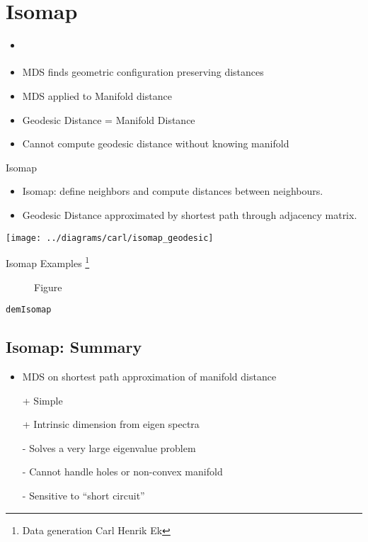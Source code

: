 \section{Isomap}


\begin{itemize}
\item \emph{\cite{Tenenbaum:isomap00}}
\item MDS finds geometric configuration preserving distances 
\item MDS applied to Manifold distance 
\item Geodesic Distance = Manifold Distance 
\item Cannot compute geodesic distance without knowing manifold 
\end{itemize}
Isomap
\begin{itemize}
\item Isomap: define neighbors and compute distances between neighbours.
\item Geodesic Distance approximated by shortest path through adjacency
matrix. 
\end{itemize}
\texttt{[image: ../diagrams/carl/isomap\_geodesic]}

Isomap Examples%
\footnote{Data generation Carl Henrik Ek%
}%
\begin{figure}


\hfill{}


\hfill{}

\hfill{}\caption{Figure}

\end{figure}


\texttt{demIsomap}

\subsection{Isomap: Summary}
\begin{itemize}
\item MDS on shortest path approximation of manifold distance 
\item [+] Simple 
\item [+] Intrinsic dimension from eigen spectra 
\item [-] Solves a very large eigenvalue problem 
\item [-] Cannot handle holes or non-convex manifold 
\item [-] Sensitive to {}``short circuit'' 
\end{itemize}

